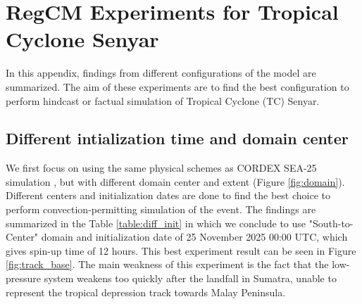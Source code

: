 \documentclass[journal abbreviation, manuscript]{copernicus}
\begin{document}











\appendix
\section{RegCM Experiments for Tropical Cyclone Senyar}
\label{appendix:exp}

In this appendix, findings from different configurations of the model are summarized. The aim of these experiments are to find the best configuration to perform hindcast or factual simulation of Tropical Cyclone (TC) Senyar.

\subsection*{Different intialization time and domain center}

We first focus on using the same physical schemes as CORDEX SEA-25 simulation \citep{coppola20255th}, but with different domain center and extent (Figure \ref{fig:domain}). Different centers and initialization dates are done to find the best choice to perform convection-permitting simulation of the event. The findings are summarized in the Table \ref{table:diff_init} in which we conclude to use "South-to-Center" domain and initialization date of 25 November 2025 00:00 UTC, which gives spin-up time of 12 hours. This best experiment result can be seen in Figure \ref{fig:track_base}. The main weakness of this experiment is the fact that the low-pressure system weakens too quickly after the landfall in Sumatra, unable to represent the tropical depression track towards Malay Peninsula.
\end{document}
